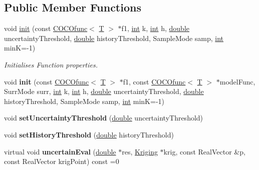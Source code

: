 \subsection*{Public Member Functions}
\begin{DoxyCompactItemize}
\item 
void \hyperlink{classUncertainFunc_a19b36c606e6e0e6bb7fec851ff2a0f8e}{init} (const \hyperlink{classCOCOfunc}{C\+O\+C\+Ofunc}$<$ \hyperlink{classT}{T} $>$ $\ast$f1, \hyperlink{classint}{int} k, \hyperlink{classint}{int} h, \hyperlink{classdouble}{double} uncertainty\+Threshold, \hyperlink{classdouble}{double} history\+Threshold, Sample\+Mode samp, \hyperlink{classint}{int} minK=-\/1)
\begin{DoxyCompactList}\small\item\em Initialises Function properties. \end{DoxyCompactList}\item 
void {\bfseries init} (const \hyperlink{classCOCOfunc}{C\+O\+C\+Ofunc}$<$ \hyperlink{classT}{T} $>$ $\ast$f1, const \hyperlink{classCOCOfunc}{C\+O\+C\+Ofunc}$<$ \hyperlink{classT}{T} $>$ $\ast$model\+Func, Surr\+Mode surr, \hyperlink{classint}{int} k, \hyperlink{classint}{int} h, \hyperlink{classdouble}{double} uncertainty\+Threshold, \hyperlink{classdouble}{double} history\+Threshold, Sample\+Mode samp, \hyperlink{classint}{int} minK=-\/1)\hypertarget{classUncertainFunc_aa9793decff59b54e743c1fb1af58166a}{}\label{classUncertainFunc_aa9793decff59b54e743c1fb1af58166a}

\item 
void {\bfseries set\+Uncertainty\+Threshold} (\hyperlink{classdouble}{double} uncertainty\+Threshold)\hypertarget{classUncertainFunc_ac85e8f24d6a94afc53d90213ca0aec6e}{}\label{classUncertainFunc_ac85e8f24d6a94afc53d90213ca0aec6e}

\item 
void {\bfseries set\+History\+Threshold} (\hyperlink{classdouble}{double} history\+Threshold)\hypertarget{classUncertainFunc_aca5c5df4e4cd7f0a89ea33651091d8c0}{}\label{classUncertainFunc_aca5c5df4e4cd7f0a89ea33651091d8c0}

\item 
virtual void {\bfseries uncertain\+Eval} (\hyperlink{classdouble}{double} $\ast$res, \hyperlink{classKriging}{Kriging} $\ast$krig, const Real\+Vector \&p, const Real\+Vector krig\+Point) const =0\hypertarget{classUncertainFunc_aa03532b2465d715c86e8df5f3ba8778f}{}\label{classUncertainFunc_aa03532b2465d715c86e8df5f3ba8778f}


\end{DoxyCompactItemize}
